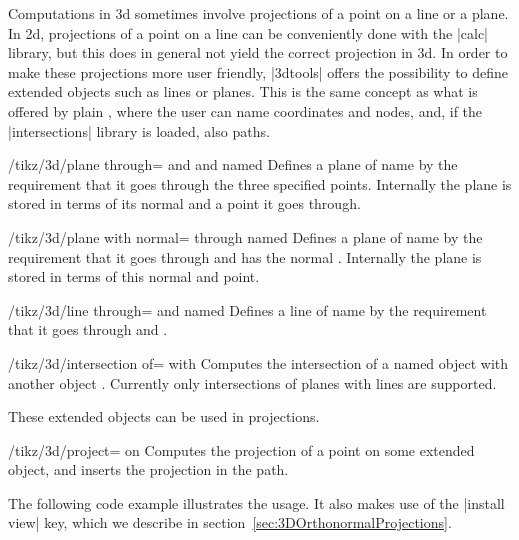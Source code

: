 \documentclass[a4paper,fleqn]{ltxdoc}
\begin{document}
Computations in 3d sometimes involve projections of a point on a line or a
plane. In 2d, projections of a point on a line can be conveniently done with the
|calc| library, but this does in general not yield the correct projection in 3d.
In order to make these projections more user friendly, |3dtools| offers the
possibility to define extended objects such as lines or planes. This is the same
concept as what is offered by plain \tikzname, where  the user can name
coordinates and nodes, and, if the |intersections| library is loaded, also
paths.

\begin{key}{/tikz/3d/plane through= and  and 
named }
    Defines a plane of name  by the requirement that it goes through
	the three specified points. Internally the plane is stored in terms of its
	normal and a point it goes through. 
\end{key}

\begin{key}{/tikz/3d/plane with normal= through  named }
	Defines a plane of name  by the requirement that it goes through
	 and has the normal .  Internally the plane is
	stored in terms of this normal and point. 
\end{key}

\begin{key}{/tikz/3d/line through= and  named }
	Defines a line of name  by the requirement that it goes through
	 and .   
\end{key}

\begin{key}{/tikz/3d/intersection of= with }
    Computes the intersection of a named object  with another
	object . Currently only intersections of planes with lines
	are supported.	
\end{key}

These extended objects can be used in projections.

\begin{key}{/tikz/3d/project= on }
	Computes the projection of a point on some extended object, and inserts the
	projection in the path.   
\end{key}


The following code example illustrates the usage. It also makes use of the
|install view| key, which we describe in
section~\ref{sec:3DOrthonormalProjections}. 
\end{document}

